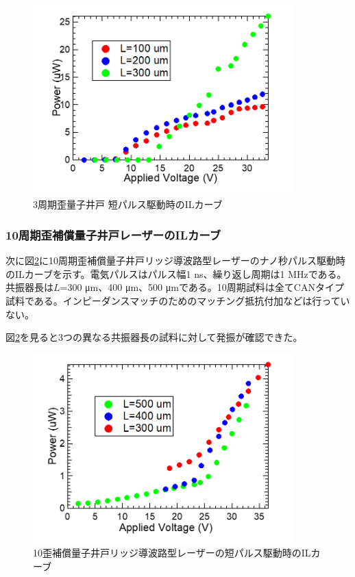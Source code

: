 {\begin{figure}[h]
	\centering
	\includegraphics[width=10cm]{figure/fig_3_2_3QW_ridge_GS_power.png}
		\caption{3周期歪量子井戸 短パルス駆動時のILカーブ}
		\label{fig:fig_3_2_3QW_ridge_GS_power}
\end{figure}


\newpage
\subsubsection{10周期歪補償量子井戸レーザーのILカーブ}
次に図\ref{fig:fig_3_2_10QW_ridge_GS_power}に10周期歪補償量子井戸リッジ導波路型レーザーのナノ秒パルス駆動時のILカーブを示す。電気パルスはパルス幅1 ns、繰り返し周期は1 MHzである。共振器長は$L$=300 \si{\micro\metre}、400 \si{\micro\metre}、500 \si{\micro\metre}である。10周期試料は全てCANタイプ試料である。インピーダンスマッチのためのマッチング抵抗付加などは行っていない。

図\ref{fig:fig_3_2_10QW_ridge_GS_power}を見ると3つの異なる共振器長の試料に対して発振が確認できた。
\begin{figure}[h]
	\centering
	\includegraphics[width=10cm]{figure/fig_3_2_10QW_ridge_GS_power.png}
		\caption{10歪補償量子井戸リッジ導波路型レーザーの短パルス駆動時のILカーブ}
		\label{fig:fig_3_2_10QW_ridge_GS_power}
\end{figure}
\clearpage
}
